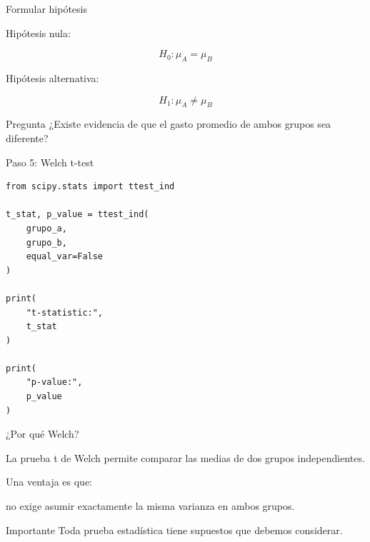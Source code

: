 \documentclass[aspectratio=169,11pt]{beamer}
\begin{document}
\begin{frame}{Formular hipótesis}

Hipótesis nula:

\[
H_0:
\mu_A
=
\mu_B
\]

Hipótesis alternativa:

\[
H_1:
\mu_A
\neq
\mu_B
\]

\vspace{0.5cm}

\begin{block}{Pregunta}
¿Existe evidencia de que el gasto promedio de ambos grupos sea diferente?
\end{block}

\end{frame}


\begin{frame}[fragile]{Paso 5: Welch t-test}

\begin{lstlisting}
from scipy.stats import ttest_ind

t_stat, p_value = ttest_ind(
    grupo_a,
    grupo_b,
    equal_var=False
)

print(
    "t-statistic:",
    t_stat
)

print(
    "p-value:",
    p_value
)
\end{lstlisting}

\end{frame}


\begin{frame}{¿Por qué Welch?}

La prueba t de Welch permite comparar las medias de dos grupos independientes.

Una ventaja es que:

\begin{center}

no exige asumir exactamente la misma varianza en ambos grupos.

\end{center}

\vspace{0.4cm}

\begin{alertblock}{Importante}
Toda prueba estadística tiene supuestos que debemos considerar.
\end{alertblock}

\end{frame}
\end{document}
